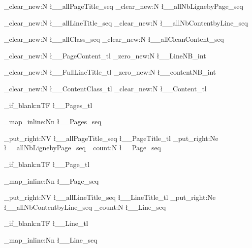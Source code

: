 \ExplSyntaxOn
\NewDocumentCommand{}
{    
    \seq_clear_new:N \l__allPageTitle_seq
    \seq_clear_new:N \l__allNbLignebyPage_seq
    
    \seq_clear_new:N \l__allLineTitle_seq
    \seq_clear_new:N \l__allNbContentbyLine_seq
    
    \seq_clear_new:N \l__allClass_seq
    \seq_clear_new:N \l__allCleanContent_seq

    \tl_clear_new:N \l__PageContent_tl
    \int_zero_new:N \l__LineNB_int

    \tl_clear_new:N \l__FullLineTitle_tl
    \int_zero_new:N \l__contentNB_int

    \tl_clear_new:N \l__ContentClass_tl
    \tl_clear_new:N \l__Content_tl
    
    
    

    \tl_if_blank:nTF {\l__Pages_tl}
        {}%
        {%
            \seq_map_inline:Nn \l__Pages_seq 
            {
            
            \seq_put_right:NV \l__allPageTitle_seq \l__PageTitle_tl
            \seq_put_right:Ne \l__allNbLignebyPage_seq {\seq_count:N \l__Page_seq}
            

            \tl_if_blank:nTF {\l__Page_tl}
                {}%
                {%
                \seq_map_inline:Nn \l__Page_seq
                    {                   
                    
                    \seq_put_right:NV \l__allLineTitle_seq \l__LineTitle_tl
                    \seq_put_right:Ne \l__allNbContentbyLine_seq {\seq_count:N \l__Line_seq}
                    
                    \tl_if_blank:nTF {\l__Line_tl}
                        {}%
                        {%
                        \seq_map_inline:Nn \l__Line_seq
                            {                   

}}}}}}}
